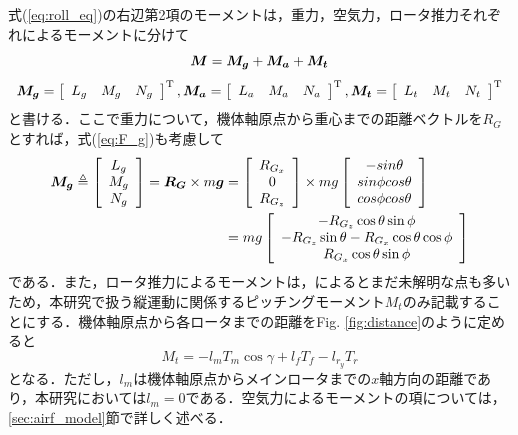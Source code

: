 式(\ref{eq:roll_eq})の右辺第2項のモーメントは，重力，空気力，ロータ推力それぞれによるモーメントに分けて
\begin{equation}
    \mbox{\boldmath $M$} = \mbox{\boldmath $M_g$} + \mbox{\boldmath $M_a$} + \mbox{\boldmath $M_t$}
\end{equation}
\begin{align*}
  \mbox{\boldmath $M_g$} =
  \left[
  \begin{array}{c}
    L_g \quad M_g \quad N_g
  \end{array}
  \right]^{\mathrm{T}},
  \mbox{\boldmath $M_a$} =
  \left[
  \begin{array}{c}
    L_a \quad M_a \quad N_a
  \end{array}
  \right]^{\mathrm{T}},
  \mbox{\boldmath $M_t$} =
  \left[
  \begin{array}{c}
    L_t \quad M_t \quad N_t
  \end{array}
  \right]^{\mathrm{T}}
\end{align*}
と書ける．ここで重力について，機体軸原点から重心までの距離ベクトルを\mbox{\boldmath $R_G$}とすれば，式(\ref{eq:F_g})も考慮して
\begin{equation}
  \begin{split}
    \mbox{\boldmath $M_g$} \triangleq
    \left[
    \begin{array}{ccc}
      L_g \\
      M_g \\
      N_g
    \end{array}
    \right] =
    \mbox{\boldmath $R_G$} \times
    m\mbox{\boldmath $g$} &=
    \left[
    \begin{array}{ccc}
      R_{G_x} \\
      0 \\
      R_{G_z}
    \end{array}
    \right] \times mg
    \left[
    \begin{array}{ccc}
      -sin\theta \\
      sin\phi cos\theta \\
      cos\phi cos\theta
    \end{array}
    \right] \\
    &= mg
    \left[
    \begin{array}{ccc}
      -R_{G_z}\cos\theta\sin\phi \\
      -R_{G_z}\sin\theta - R_{G_x}\cos\theta\cos\phi \\
      R_{G_x}\cos\theta\sin\phi
    \end{array}
    \right]
  \end{split}
  \label{eq:M_g}
\end{equation}
である．また，ロータ推力によるモーメントは，\cite{}によるとまだ未解明な点も多いため，本研究で扱う縦運動に関係するピッチングモーメント$M_t$のみ記載することにする．機体軸原点から各ロータまでの距離をFig. \ref{fig:distance}のように定めると
\begin{equation}
  M_t = -l_m T_m \cos\gamma + l_f T_f - l_{r_y} T_r
  \label{eq:M_t}
\end{equation}
となる．ただし，$l_m$は機体軸原点からメインロータまでの$x$軸方向の距離であり，本研究においては$l_m=0$である．空気力によるモーメントの項については，\ref{sec:airf_model}節で詳しく述べる．

